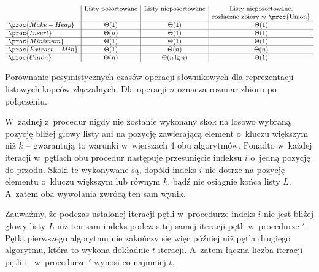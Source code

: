 \begin{table}[ht]
	\begin{center}
		\[
			\begin{array}{l|c|c|c}
				& \text{Listy posortowane} & \text{Listy nieposortowane} & \text{Listy nieposortowane,} \\
				&  &  & \text{rozłączne zbiory w~\proc{Union}} \\
				\hline
				\proc{Make-Heap} & \Theta(1) & \Theta(1) & \Theta(1) \\
				\hline
				\proc{Insert} & \Theta(n) & \Theta(1) & \Theta(1) \\
				\hline
				\proc{Minimum} & \Theta(1) & \Theta(1) & \Theta(1) \\
				\hline
				\proc{Extract-Min} & \Theta(1) & \Theta(n) & \Theta(n) \\
				\hline
				\proc{Union} & \Theta(n) & \Theta(n\lg n) & \Theta(1)
			\end{array}
		\]
	\end{center}
	\caption{Porównanie pesymistycznych czasów operacji słownikowych dla reprezentacji listowych kopców złączalnych.
Dla operacji  $n$ oznacza rozmiar zbioru po połączeniu.} \label{tab:10-2}
\end{table}


\subproblem %
W~żadnej z~procedur nigdy nie zostanie wykonany skok na losowo wybraną pozycję bliżej głowy listy ani na pozycję zawierającą element o~kluczu większym niż $k$ -- gwarantują to warunki w~wierszach 4 obu algorytmów.
Ponadto w~każdej iteracji w~pętlach  obu procedur następuje przesunięcie indeksu $i$ o~jedną pozycję do przodu.
Skoki te wykonywane są, dopóki indeks $i$ nie dotrze na pozycję elementu o~kluczu większym lub równym $k$, bądź nie osiągnie końca listy $L$.
A~zatem oba wywołania zwrócą ten sam wynik.

Zauważmy, że podczas ustalonej iteracji pętli  w~procedurze  indeks $i$ nie jest bliżej głowy listy $L$ niż ten sam indeks podczas tej samej iteracji pętli  w~procedurze $'$.
Pętla pierwszego algorytmu nie zakończy się więc później niż pętla drugiego algorytmu, która to wykona dokładnie $t$ iteracji.
A~zatem łączna liczba iteracji pętli  i~ w~procedurze $'$ wynosi co najmniej $t$.

